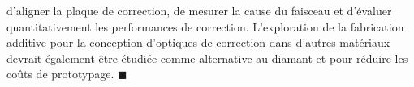 \begin{refsection}
d'aligner la plaque de correction, de mesurer la cause du faisceau et d'évaluer quantitativement les performances de correction. L'exploration de la fabrication additive pour la conception d'optiques de correction dans d'autres matériaux devrait également être étudiée comme alternative au diamant et pour réduire les coûts de prototypage. $\blacksquare$

\printbibliography[heading=subbibliography]
\end{refsection}